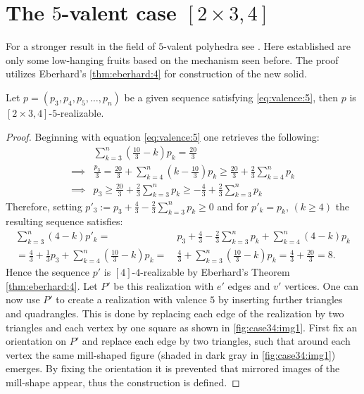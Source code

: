 \section{The $5$-valent case $[2 \times 3, 4]$}
For a stronger result in the field of $5$-valent polyhedra see \cite{trenkler1975face}. Here established are only some low-hanging fruits based on the mechanism seen before. The proof utilizes Eberhard's \autoref{thm:eberhard:4} for construction of the new solid.
\begin{theorem}
  Let $p = (p_3, p_4, p_5, \dots, p_n)$ be a given sequence satisfying \autoref{eq:valence:5}, then $p$ is $[2\times3, 4]$-$5$-realizable.
  \begin{proof}
    Beginning with equation \autoref{eq:valence:5} one retrieves the following:
    \begin{align*}
      &\sum_{k=3}^n \left( \frac{10}{3} - k \right) p_k = \frac{20}{3} \\
      \implies & \frac{p_3}{3} = \frac{20}{3} + \sum_{k=4}^n \left(k - \frac{10}{3} \right) p_k \geq \frac{20}{3} + \frac{2}{3} \sum_{k=4}^n p_k \\
      \implies & p_3 \geq \frac{20}{3} + \frac{2}{3} \sum_{k=3}^n p_k \geq - \frac{4}{3} + \frac{2}{3} \sum_{k=3}^n p_k
    \end{align*}
    Therefore, setting $p'_3 := p_3 + \frac{4}{3} - \frac{2}{3} \sum_{k=3}^n p_k \geq 0$ and for $p'_k = p_k$, $(k\geq 4)$ the resulting sequence satisfies:
    \begin{align*}
      \sum_{k=3}^n (4 - k) p'_k =&~ p_3 + \frac{4}{3} - \frac{2}{3} \sum_{k=3}^n p_k + \sum_{k=4}^n (4 - k) p_k \\
      = \frac{4}{3} + \frac{1}{3} p_3 + \sum_{k=4}^n \left(\frac{10}{3} - k \right) p_k =&~ \frac{4}{3} + \sum_{k=3}^n \left(\frac{10}{3} - k \right) p_k = \frac{4}{3} + \frac{20}{3} = 8.
    \end{align*}
    Hence the sequence $p'$ is $[4]$-$4$-realizable by Eberhard's Theorem \autoref{thm:eberhard:4}. Let $P'$ be this realization with $e'$ edges and $v'$ vertices. One can now use $P'$ to create a realization with valence $5$ by inserting further triangles and quadrangles. This is done by replacing each edge of the realization by two triangles and each vertex by one square as shown in \autoref{fig:case34:img1}. First fix an orientation on $P'$ and replace each edge by two triangles, such that around each vertex the same mill-shaped figure (shaded in dark gray in \autoref{fig:case34:img1}) emerges. By fixing the orientation it is prevented that mirrored images of the mill-shape appear, thus the construction is defined.


\end{proof}
\end{theorem}
